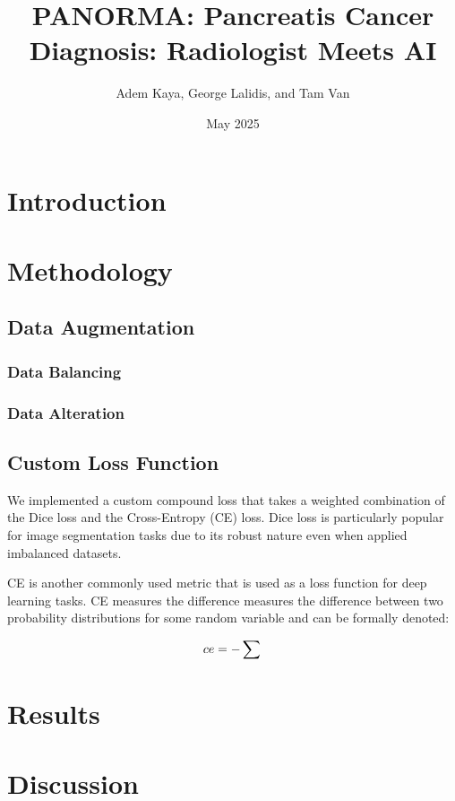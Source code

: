 \documentclass[12pt]{article}
\title{PANORMA: Pancreatis Cancer Diagnosis: Radiologist Meets AI}
\author{Adem Kaya, George Lalidis, and Tam Van}
\date{May 2025}
\begin{document}
\maketitle

\section{Introduction}

\section{Methodology}

\subsection{Data Augmentation}
\subsubsection{Data Balancing}
\subsubsection{Data Alteration}

\subsection{Custom Loss Function}
We implemented a custom compound loss that takes a weighted combination of the Dice loss and the Cross-Entropy 
(CE) loss. Dice loss is particularly popular for image segmentation tasks due to its robust nature even when applied
imbalanced datasets. 

CE is another commonly used metric that is used as a loss function for deep learning tasks. CE measures the difference
measures the difference between two probability distributions for some random variable and can be formally denoted:

\begin{equation}
    \centering
    ce = -\sum{}
\end{equation}
\section{Results}
\section{Discussion}
\printbibliography
\end{document}
